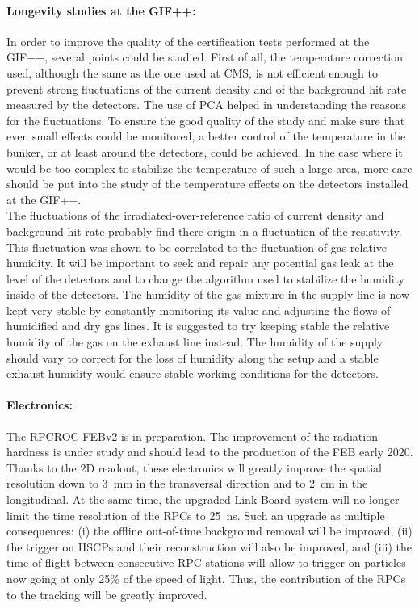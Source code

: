 	\paragraph*{Longevity studies at the GIF++:} In order to improve the quality of the certification tests performed at the GIF++, several points could be studied. First of all, the temperature correction used, although the same as the one used at CMS, is not efficient enough to prevent strong fluctuations of the current density and of the background hit rate measured by the detectors. The use of \acl{PCA} helped in understanding the reasons for the fluctuations. To ensure the good quality of the study and make sure that even small effects could be monitored, a better control of the temperature in the bunker, or at least around the detectors, could be achieved. In the case where it would be too complex to stabilize the temperature of such a large area, more care should be put into the study of the temperature effects on the detectors installed at the GIF++.\\
	The fluctuations of the irradiated-over-reference ratio of current density and background hit rate probably find there origin in a fluctuation of the resistivity. This fluctuation was shown to be correlated to the fluctuation of gas relative humidity. It will be important to seek and repair any potential gas leak at the level of the detectors and to change the algorithm used to stabilize the humidity inside of the detectors. The humidity of the gas mixture in the supply line is now kept very stable by constantly monitoring its value and adjusting the flows of humidified and dry gas lines. It is suggested to try keeping stable the relative humidity of the gas on the exhaust line instead. The humidity of the supply should vary to correct for the loss of humidity along the setup and a stable exhaust humidity would ensure stable working conditions for the detectors.
	
	\paragraph*{Electronics:} The RPCROC FEBv2 is in preparation. The improvement of the radiation hardness is under study and should lead to the production of the FEB early 2020. Thanks to the 2D readout, these electronics will greatly improve the spatial resolution  down to \SI{3}{mm} in the transversal direction and to \SI{2}{cm} in the longitudinal. At the same time, the upgraded Link-Board system will no longer limit the time resolution of the RPCs to \SI{25}{ns}. Such an upgrade as multiple consequences: (i) the offline out-of-time background removal will be improved, (ii) the trigger on HSCPs and their reconstruction will also be improved, and (iii) the time-of-flight between consecutive RPC stations will allow to trigger on particles now going at only 25\% of the speed of light. Thus, the contribution of the RPCs to the tracking will be greatly improved.
	
